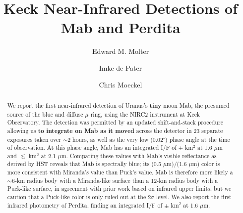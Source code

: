 \documentclass[preprint]{aastex631}
\begin{document}
	
\newcommand{\ergsec}{erg s$^{-1}$ cm$^{-2}$ $\mu$m$^{-1}$}

\title{Keck Near-Infrared Detections of Mab and Perdita}

\author[0000-0003-3799-9033]{Edward M. Molter}

\author[0000-0002-4278-3168]{Imke de Pater}

\author[0000-0002-6293-1797]{Chris Moeckel}

\linenumbers

\begin{abstract}
We report the first near-infrared detection of Uranus's \textbf{tiny} moon Mab, the presumed source of the blue and diffuse $\mu$ ring, using the NIRC2 instrument at Keck Observatory. The detection was permitted by an updated shift-and-stack procedure allowing us \textbf{to integrate on Mab as it moved} across the detector in 23 separate exposures taken over $\sim$2 hours, as well as the very low (0.02$^\circ$) phase angle at the time of observation.
At this phase angle, Mab has an integrated I/F of 
 $\pm$  km$^{2}$ 
at 1.6 $\mu$m and 
$\lesssim$ km$^{2}$ 
at 2.1 $\mu$m. 
Comparing these values with Mab's visible reflectance as derived by HST reveals that Mab is spectrally blue; its (0.5 $\mu$m)/(1.6 $\mu$m) color is more consistent with Miranda's value than Puck's value. Mab is therefore more likely a $\sim$6-km radius body with a Miranda-like surface than a 12-km radius body with a Puck-like surface, in agreement with prior work based on infrared upper limits, but we caution that a Puck-like color is only ruled out at the 2$\sigma$ level.
We also report the first infrared photometry of Perdita, finding an integrated I/F of 
 $\pm$  km$^{2}$ at 1.6 $\mu$m.
\end{abstract}

\end{document}
